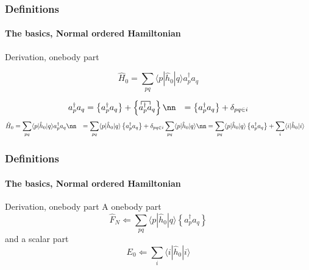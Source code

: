 \documentclass[compress]{beamer}
\newcommand*{\ket}[1]{|#1\rangle}
\newcommand*{\bra}[1]{\langle#1|}
\newcommand{\element}[3]
        {\bra{#1}#2\ket{#3}}
\begin{document}
\begin{frame}[fragile]
    \frametitle{Definitions}
    \framesubtitle{The basics, Normal ordered Hamiltonian}

    \small
    \begin{block}{Derivation, onebody part}
    
    \begin{equation*}
        \hat{H}_0 = \sum_{pq} \element{p}{\hat{h}_0}{q} a^\dagger_p a_q
    \end{equation*}

    \begin{align*}
        a^\dagger_p a_q &= \left\{a^\dagger_p a_q\right\} + \left\{ 
    \contraction{}{a}{{}^{\dagger}_p}{a}
    a^\dagger_p a_q
    \right\} \nn
        &= \left\{a^\dagger_p a_q\right\} + \delta_{pq\in i}
    \end{align*}
    \begin{align*}
        \hat{H}_0 &= \sum_{pq} \element{p}{\hat{h}_0}{q} a^\dagger_p a_q \nn
            &= \sum_{pq} \element{p}{\hat{h}_0}{q} \left\{a^\dagger_p a_q\right\} + 
                \delta_{pq\in i} \sum_{pq} \element{p}{\hat{h}_0}{q} \nn
            &= \sum_{pq} \element{p}{\hat{h}_0}{q} \left\{a^\dagger_p a_q\right\} +
                \sum_i \element{i}{\hat{h}_0}{i}
    \end{align*}



    \end{block}
\end{frame}

\begin{frame}[fragile]
    \frametitle{Definitions}
    \framesubtitle{The basics, Normal ordered Hamiltonian}

    \begin{block}{Derivation, onebody part}
    A onebody part
    \begin{equation*}
            \hat{F}_N \Leftarrow \sum_{pq} \element{p}{\hat{h}_0}{q} \left\{a^\dagger_p a_q\right\}
    \end{equation*}
    and a scalar part
    \begin{equation*}
                E_0 \Leftarrow \sum_i \element{i}{\hat{h}_0}{i}
    \end{equation*}



    \end{block}
\end{frame}
\end{document}
